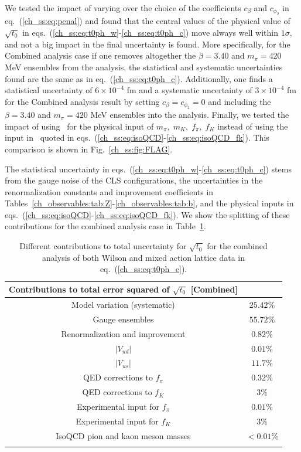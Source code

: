 We tested the impact of varying over the choice of the coefficients $c_{\beta}$ and $c_{\phi_2}$ in eq.~(\ref{ch_ss:eq:penal}) and found that the central values of the physical value of $\sqrt{t_0}$ in eqs.~(\ref{ch_ss:eq:t0ph_w}-\ref{ch_ss:eq:t0ph_c}) move always well within $1\sigma$, and not a big impact in the final uncertainty is found. More specifically, for the Combined analysis case if one removes altogether the $\beta=3.40$ and $m_{\pi}=420$ MeV ensembles from the analysis, the statistical and systematic uncertainties found are the same as in eq.~(\ref{ch_ss:eq:t0ph_c}). Additionally, one finds a statistical uncertainty of $6\times10^{-4}$ fm and a systematic uncertainty of $3\times10^{-4}$ fm for the Combined analysis result by setting $c_{\beta}=c_{\phi_2}=0$ and including the $\beta=3.40$ and $m_{\pi}=420$ MeV ensembles into the analysis. Finally, we tested the impact of using~\citep{FLAG16} for the physical input of $m_{\pi},\;m_K,\;f_{\pi},\;f_K$ instead of using the input in~\citep{FlavourLatticeAveragingGroupFLAG:2021npn} quoted in eqs.~(\ref{ch_ss:eq:isoQCD}-\ref{ch_ss:eq:isoQCD_fk}). This comparison is shown in Fig.~\ref{ch_ss:fig:FLAG}.

The statistical uncertainty in eqs.~(\ref{ch_ss:eq:t0ph_w}-\ref{ch_ss:eq:t0ph_c}) stems from the gauge noise of the CLS configurations, the uncertainties in the renormalization constants and improvement coefficients in Tables~\ref{ch_observables:tab:Z}-\ref{ch_observables:tab:b}, and the physical inputs in eqs.~(\ref{ch_ss:eq:isoQCD}-\ref{ch_ss:eq:isoQCD_fk}). We show the splitting of these contributions for the combined analysis case in Table~\ref{ch_ss:tab:stat}.

\begin{longtable}{c c}
\label{ch_ss:tab:stat}
	Contributions to total error squared of $\sqrt{t_0}$ [Combined] & \\
	\toprule
	Model variation (systematic) & $25.42\%$ \\
	Gauge ensembles & $55.72\%$ \\
	Renormalization and improvement & $0.82\%$ \\
	$\left|V_{ud}\right|$ & $0.01\%$ \\
	$\left|V_{us}\right|$ & $11.7\%$ \\
	QED corrections to $f_{\pi}$ & $0.32\%$ \\
	QED corrections to $f_K$ & $3\%$ \\
	Experimental input for $f_{\pi}$ & $0.01\%$ \\
	Experimental input for $f_K$ & $3\%$ \\
	IsoQCD pion and kaon meson masses & $<0.01\%$ \\
    \bottomrule
    \caption{Different contributions to total uncertainty for $\sqrt{t_0}$ for the combined analysis of both Wilson and mixed action lattice data in eq.~(\ref{ch_ss:eq:t0ph_c}).}
\end{longtable}

